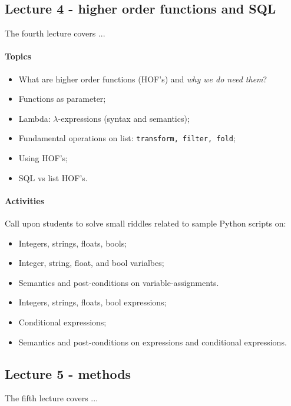			\subsection{Lecture 4 - higher order functions and SQL}
				The fourth lecture covers ...

				\paragraph*{Topics}
					\begin{itemize}
						\item What are higher order functions (HOF's) and \textit{why we do need them}?
						\item Functions as parameter;
						\item Lambda: $\lambda$-expressions (syntax and semantics);
						\item Fundamental operations on list: \texttt{transform, filter, fold};
						\item Using HOF's;
						\item SQL vs list HOF's.
					\end{itemize}

				\paragraph*{Activities}
					Call upon students to solve small riddles related to sample Python scripts on:

					\begin{itemize}
						\item Integers, strings, floats, bools;
						\item Integer, string, float, and bool varialbes;
						\item Semantics and post-conditions on variable-assignments.
						\item Integers, strings, floats, bool expressions;
						\item Conditional expressions;
						\item Semantics and post-conditions on expressions and conditional expressions.
					\end{itemize}

			\subsection{Lecture 5 - methods}
				The fifth lecture covers ...

